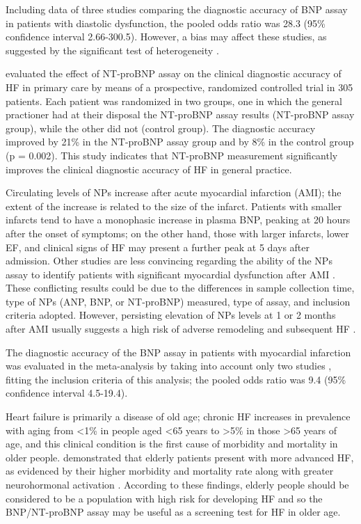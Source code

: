 \documentclass[14pt,a4paper,onecolumn]{extarticle}
\begin{document}
Including data of three studies comparing the diagnostic accuracy of BNP assay in patients with diastolic dysfunction, the pooled odds ratio was 28.3 (95\% confidence interval 2.66-300.5). However, a bias may affect these studies, as suggested by the significant test of heterogeneity \citep{bib372}.

\citep{bib3133} evaluated the effect of NT-proBNP assay on the clinical diagnostic accuracy of HF in primary care by means of a prospective, randomized controlled trial in 305 patients. Each patient was randomized in two groups, one in which the general practioner had at their disposal the NT-proBNP assay results (NT-proBNP assay group), while the other did not (control group). The diagnostic accuracy improved by 21\% in the NT-proBNP assay group and by 8\% in the control group (p = 0.002). This study indicates that NT-proBNP measurement significantly improves the clinical diagnostic accuracy of HF in general practice.

Circulating levels of NPs increase after acute myocardial infarction (AMI); the extent of the increase is related to the size of the infarct. Patients with smaller infarcts tend to have a monophasic increase in plasma BNP, peaking at 20 hours after the onset of symptoms; on the other hand, those with larger infarcts, lower EF, and clinical signs of HF may present a further peak at 5 days after admission. Other studies are less convincing regarding the ability of the NPs assay to identify patients with significant myocardial dysfunction after AMI \citep{bib3139}. These conflicting results could be due to the differences in sample collection time, type of NPs (ANP, BNP, or NT-proBNP) measured, type of assay, and inclusion criteria adopted. However, persisting elevation of NPs levels at 1 or 2 months after AMI usually suggests a high risk of adverse remodeling and subsequent HF \citep{bib35}.

The diagnostic accuracy of the BNP assay in patients with myocardial infarction was evaluated in the meta-analysis by \citep{bib372} taking into account only two studies \citep{bib3140} \citep{bib3177}, fitting the inclusion criteria of this analysis; the pooled odds ratio was 9.4 (95\% confidence interval 4.5-19.4).

Heart failure is primarily a disease of old age; chronic HF increases in prevalence with aging from <1\% in people aged <65 years to >5\% in those >65 years of age, and this clinical condition is the first cause of morbidity and mortality in older people. \citep{bib3193} demonstrated that elderly patients present with more advanced HF, as evidenced by their higher morbidity and mortality rate along with greater neurohormonal activation . According to these findings, elderly people should be considered to be a population with high risk for developing HF and so the BNP/NT-proBNP assay may be useful as a screening test for HF in older age.
\end{document}
